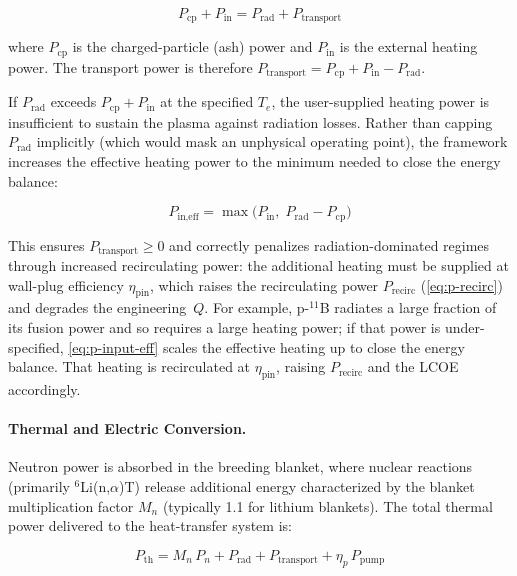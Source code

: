 \documentclass{article}
\begin{document}
\begin{equation}
\label{eq:plasma-balance}
P_{\text{cp}} + P_{\text{in}} = P_{\text{rad}} + P_{\text{transport}}
\end{equation}

\noindent where $P_{\text{cp}}$ is the charged-particle (ash) power and
$P_{\text{in}}$ is the external heating power. The transport power is
therefore $P_{\text{transport}} = P_{\text{cp}} + P_{\text{in}} - P_{\text{rad}}$.

If $P_{\text{rad}}$ exceeds $P_{\text{cp}} + P_{\text{in}}$ at the
specified $T_e$, the user-supplied heating power is insufficient to
sustain the plasma against radiation losses. Rather than capping
$P_{\text{rad}}$ implicitly (which would mask an unphysical operating
point), the framework increases the effective heating power to the
minimum needed to close the energy balance:

\begin{equation}
\label{eq:p-input-eff}
P_{\text{in,eff}} = \max\!\bigl(P_{\text{in}},\;
  P_{\text{rad}} - P_{\text{cp}}\bigr)
\end{equation}

\noindent This ensures $P_{\text{transport}} \geq 0$ and correctly
penalizes radiation-dominated regimes through increased recirculating
power: the additional heating must be supplied at wall-plug efficiency
$\eta_{\text{pin}}$, which raises the recirculating power
$P_{\text{recirc}}$ (\cref{eq:p-recirc}) and degrades the
engineering~$Q$. For example, p-${}^{11}$B radiates a large fraction of its fusion power and
so requires a large heating power; if that power is under-specified,
\cref{eq:p-input-eff} scales the effective heating up to close the energy
balance. That heating is recirculated at $\eta_{\text{pin}}$, raising
$P_{\text{recirc}}$ and the LCOE accordingly.

\paragraph{Thermal and Electric Conversion.}

Neutron power is absorbed in the breeding blanket, where nuclear
reactions (primarily ${}^6$Li(n,$\alpha$)T) release additional energy
characterized by the blanket multiplication factor $M_n$ (typically
1.1 for lithium blankets). The total thermal power delivered to the
heat-transfer system is:

\begin{equation}
\label{eq:p-thermal}
P_{\text{th}} = M_n \, P_n + P_{\text{rad}} + P_{\text{transport}}
              + \eta_p \, P_{\text{pump}}
\end{equation}
\end{document}

